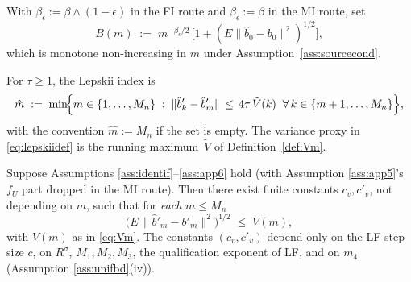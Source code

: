\begin{definition}\label{def:Bm}
With $\beta_\epsilon := \beta \wedge (1 - \epsilon)$ in the FI route and
$\beta_\epsilon := \beta$ in the MI route, set %
\begin{equation}\label{eq:Bm}
B(m) \;:=\; m^{-\beta_\epsilon/2}\,
\bigl[1 + (E\|\hat b_0 - b_0\|^2)^{1/2}\bigr],
\end{equation}
which is monotone non-increasing in $m$ under
Assumption~\ref{ass:sourcecond}.
\end{definition}

\begin{definition}\label{def:lepskii}
For $\tau \ge 1$, the Lepskii index is
\begin{equation}\label{eq:lepskiidef}
\hat m \;:=\; \min\!\Bigl\{m \in \{1,\ldots, M_n\}\;:\;
\|\hat b'_k - \hat b'_m\| \,\le\, 4\tau\,\tilde V(k)\;\;
\forall\, k \in \{m+1, \ldots, M_n\}\Bigr\},
\end{equation}
with the convention $\hat m := M_n$ if the set is empty. The variance proxy
in \eqref{eq:lepskiidef} is the running maximum~$\tilde V$ of
Definition~\ref{def:Vm}. %
\end{definition}


\begin{lemma}\label{lem:itervar}
Suppose Assumptions \ref{ass:identif}--\ref{ass:app6} hold (with
Assumption \ref{ass:app5}'s $f_U$ part dropped in the MI route). Then there
exist finite constants $c_v, c'_v$, not depending on $m$, such that for
\emph{each} $m \le M_n$ %
\begin{equation}\label{eq:itervar}
\bigl(E\,\|\hat b'_m - b'_m\|^2\bigr)^{1/2} \;\le\; V(m),
\end{equation}
with $V(m)$ as in \eqref{eq:Vm}. The constants $(c_v, c'_v)$ depend only on
the LF step size $c$, on $R^\sigma$, $M_1, M_2, M_3$, the qualification
exponent of LF, and on $m_4$ (Assumption \ref{ass:unifbd}\textup{(iv)}).
\end{lemma}


